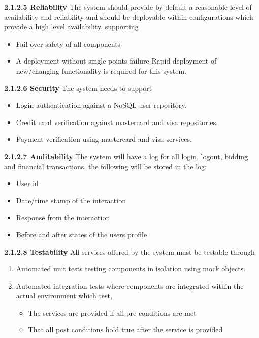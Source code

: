 \documentclass[11pt]{article}
\begin{document}
	\newline
	\textbf{2.1.2.5 Reliability}
	\newline
	\newline
	The system should provide by default a reasonable level of availability and
	reliability and should be deployable within configurations which provide a high level availability, supporting
	\begin{itemize}
		\item Fail-over safety of all components
		\item A deployment without single points failure
		Rapid deployment of new/changing functionality is required for this system.
	\end{itemize}
	\newline
	\newline
	\textbf{2.1.2.6 Security}
	\newline
	\newline
	The system needs to support 
	\begin{itemize}
		\item Login authentication against a NoSQL user repository.
		\item Credit card verification against mastercard and visa repositories.
		\item Payment verification using mastercard and visa services.
	\end{itemize}
	\newline
	\newline
	\textbf{2.1.2.7 Auditability}
	\newline
	\newline
	The system will have a log for all login, logout, bidding and financial transactions, the following will be stored in the log:
	\begin{itemize}
		\item User id
		\item Date/time stamp of the interaction
		\item Response from the interaction
		\item Before and after states of the users profile
	\end{itemize}
	\newline
	\newline
	\textbf{2.1.2.8 Testability}
	\newline
	\newline
	All services offered by the system must be testable through
	\begin{enumerate}
		\item Automated unit tests testing components in isolation using mock objects.
		\item Automated integration tests where components are integrated within the actual environment which test,
		\begin{itemize}
			\item The services are provided if all pre-conditions are met 
			\item That all post conditions hold true after the service is provided
		\end{itemize}
	\end{enumerate}
\end{document}
